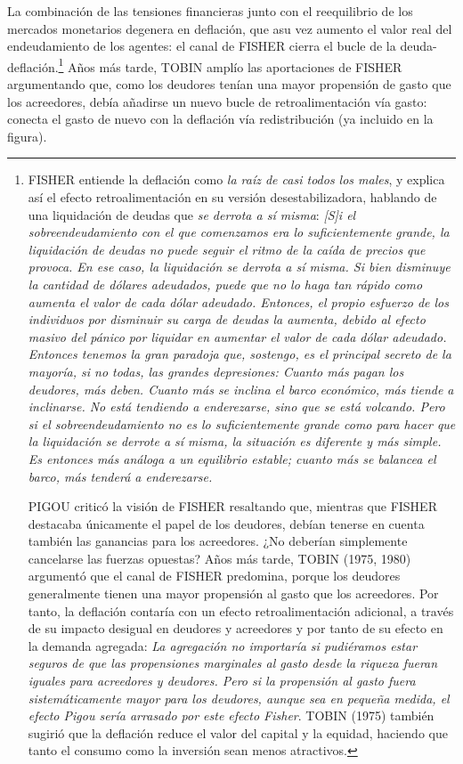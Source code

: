 \documentclass[10pt,a4paper]{article}
\begin{document}
La combinación de las tensiones financieras junto con el reequilibrio de los mercados monetarios degenera en deflación, que asu vez aumento el valor real del endeudamiento de los agentes: el canal de FISHER cierra el bucle de la deuda-deflación.\footnote{%
    FISHER entiende la deflación como \textit{la raíz de casi todos los males}, y explica así el efecto retroalimentación en su versión desestabilizadora, hablando de una liquidación de deudas que \textit{se derrota a sí misma}: \textit{[S]i el sobreendeudamiento con el que comenzamos era lo suficientemente grande, la liquidación de deudas no puede seguir el ritmo de la caída de precios que provoca. En ese caso, la liquidación se derrota a sí misma. Si bien disminuye la cantidad de dólares adeudados, puede que no lo haga tan rápido como aumenta el valor de cada dólar adeudado. Entonces, el propio esfuerzo de los individuos por disminuir su carga de deudas la aumenta, debido al efecto masivo del pánico por liquidar en aumentar el valor de cada dólar adeudado. Entonces tenemos la gran paradoja que, sostengo, es el principal secreto de la mayoría, si no todas, las grandes depresiones: Cuanto más pagan los deudores, más deben. Cuanto más se inclina el barco económico, más tiende a inclinarse. No está tendiendo a enderezarse, sino que se está volcando. Pero si el sobreendeudamiento no es lo suficientemente grande como para hacer que la liquidación se derrote a sí misma, la situación es diferente y más simple. Es entonces más análoga a un equilibrio estable; cuanto más se balancea el barco, más tenderá a enderezarse.}

PIGOU criticó la visión de FISHER resaltando que, mientras que FISHER destacaba únicamente el papel de los deudores, debían tenerse en cuenta también las ganancias para los acreedores. ¿No deberían simplemente cancelarse las fuerzas opuestas? Años más tarde, TOBIN (1975, 1980) argumentó que el canal de FISHER predomina, porque los deudores generalmente tienen una mayor propensión al gasto que los acreedores. Por tanto, la deflación contaría con un efecto retroalimentación adicional, a través de su impacto desigual en deudores y acreedores y por tanto de su efecto en la demanda agregada: \textit{La agregación no importaría si pudiéramos estar seguros de que las propensiones marginales al gasto desde la riqueza fueran iguales para acreedores y deudores. Pero si la propensión al gasto fuera sistemáticamente mayor para los deudores, aunque sea en pequeña medida, el efecto Pigou sería arrasado por este efecto Fisher}. TOBIN (1975) también sugirió que la deflación reduce el valor del capital y la equidad, haciendo que tanto el consumo como la inversión sean menos atractivos.
} Años más tarde, TOBIN amplío las aportaciones de FISHER argumentando que, como los deudores tenían una mayor propensión de gasto que los acreedores, debía añadirse un nuevo bucle de retroalimentación vía gasto: conecta el gasto de nuevo con la deflación vía redistribución (ya incluido en la figura). 
\end{document}
